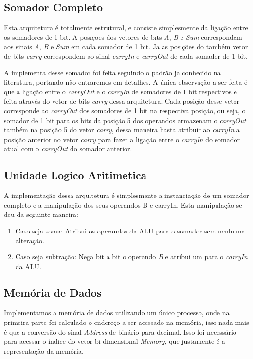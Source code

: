 \documentclass[12pt]{article}
\begin{document}
\subsection{Somador Completo}

Esta arquitetura é totalmente estrutural, e consiste simplesmente da ligação entre os somadores de 1 bit. A posições dos vetores de bits \textit{A}, \textit{B} e \textit{Sum} correspondem aos sinais \textit{A}, \textit{B} e \textit{Sum} em cada somador de 1 bit. Ja as posições do também vetor de bits \textit{carry} correspondem ao sinal \textit{carryIn} e \textit{carryOut} de cada somador de 1 bit.

A implementa desse somador foi feita seguindo o padrão ja conhecido na literatura, portando não entraremos em detalhes. A única observação a ser feita é que a ligação entre o \textit{carryOut} e o \textit{carryIn} de somadores de 1 bit respectivos é feita através do vetor de bits \textit{carry} dessa arquitetura. Cada posição desse vetor corresponde ao \textit{carryOut} dos somadores de 1 bit na respectiva posição, ou seja, o somador de 1 bit para os bits da posição 5 dos operandos armazenam o \textit{carryOut} também na posição 5 do vetor \textit{carry}, dessa maneira basta atribuir ao \textit{carryIn} a posição anterior no vetor \textit{carry} para fazer a ligação entre o \textit{carryIn} do somador atual com o \textit{carryOut} do somador anterior.

\subsection{Unidade Logico Aritimetica}

A implementação dessa arquitetura é simplesmente a instanciação de um somador completo e a manipulação dos seus operandos B e carryIn. Esta manipulação se deu da seguinte maneira:
\begin{enumerate}
 \item Caso seja soma: Atribui os operandos da ALU para o somador sem nenhuma alteração.
 \item Caso seja subtração: Nega bit a bit o operando \textit{B} e atribui um para o \textit{carryIn} da ALU.
\end{enumerate}

\subsection{Memória de Dados}

Implementamos a memória de dados utilizando um único processo, onde na primeira parte foi calculado o endereço a ser acessado na memória, isso nada mais é que a conversão do sinal \textit{Address} de binário para decimal. Isso foi necessário para acessar o índice do vetor bi-dimensional \textit{Memory}, que justamente é a representação da memória.
\end{document}
